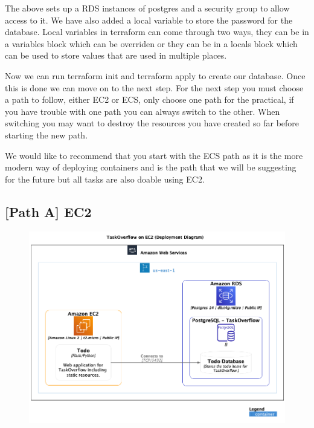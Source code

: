 \documentclass{csse4400}
\begin{document}
The above sets up a RDS instances of postgres and a security group to allow access to it. We have also added a local variable to store the password for the database. Local variables in terraform can come through two ways, they can be in a variables block which can be overriden or they can be in a locals block which can be used to store values that are used in multiple places.

Now we can run terraform init and terraform apply to create our database. Once this is done we can move on to the next step. For the next step you must choose a path to follow, either EC2 or ECS, only choose one path for the practical, if you have trouble with one path you can always switch to the other. When switching you may want to destroy the resources you have created so far before starting the new path.

We would like to recommend that you start with the ECS path as it is the more modern way of deploying containers and is the path that we will be suggesting for the future but all tasks are also doable using EC2.

\subsection{[Path A] EC2}


\begin{figure}[H]
  \includegraphics[width=\textwidth]{diagrams/ec2deployment}
\end{figure}
\end{document}
